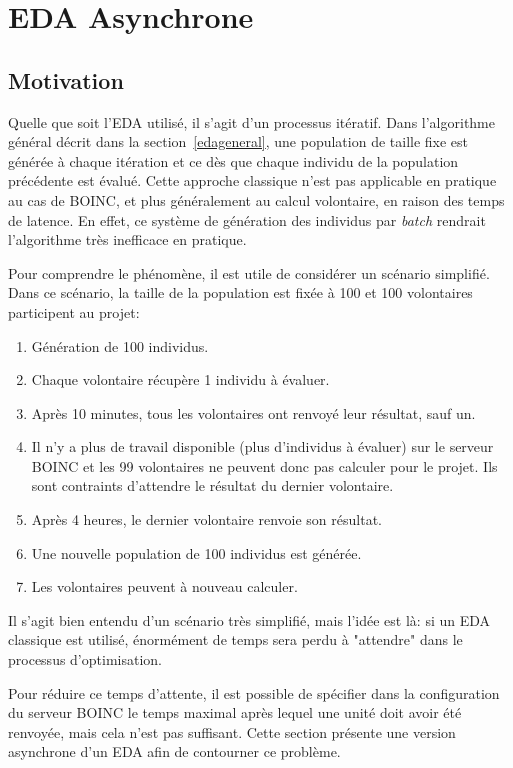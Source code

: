 \documentclass[a4paper, 12pt]{report}
\begin{document}
\section{EDA Asynchrone}
\label{edaasynch}
\subsection{Motivation}
\label{motivation}
Quelle que soit l'EDA utilisé, il s'agit d'un processus itératif. Dans l'algorithme général décrit dans la section~\ref{edageneral}, une population de taille fixe est générée à chaque itération et ce dès que chaque individu de la population précédente est évalué. Cette approche classique n'est pas applicable en pratique au cas de \textsc{BOINC}, et plus généralement au calcul volontaire, en raison des temps de latence. En effet, ce système de génération des individus par \textit{batch} rendrait l'algorithme très inefficace en pratique.

Pour comprendre le phénomène, il est utile de considérer un scénario simplifié. Dans ce scénario, la taille de la population est fixée à 100 et 100 volontaires participent au projet:
\begin{enumerate}[1)]
\item Génération de 100 individus.
\item Chaque volontaire récupère 1 individu à évaluer.
\item Après 10 minutes, tous les volontaires ont renvoyé leur résultat, sauf un.
\item Il n'y a plus de travail disponible (plus d'individus à évaluer) sur le serveur \textsc{BOINC} et les 99 volontaires ne peuvent donc pas calculer pour le projet. Ils sont contraints d'attendre le résultat du dernier volontaire.
\item Après 4 heures, le dernier volontaire renvoie son résultat.
\item Une nouvelle population de 100 individus est générée.
\item Les volontaires peuvent à nouveau calculer.
\end{enumerate}
Il s'agit bien entendu d'un scénario très simplifié, mais l'idée est là: si un EDA classique est utilisé, énormément de temps sera perdu à "attendre" dans le processus d'optimisation. 

Pour réduire ce temps d'attente, il est possible de spécifier dans la configuration du serveur \textsc{BOINC} le temps maximal après lequel une unité doit avoir été renvoyée, mais cela n'est pas suffisant. Cette section présente une version asynchrone d'un EDA afin de contourner ce problème.
\end{document}
